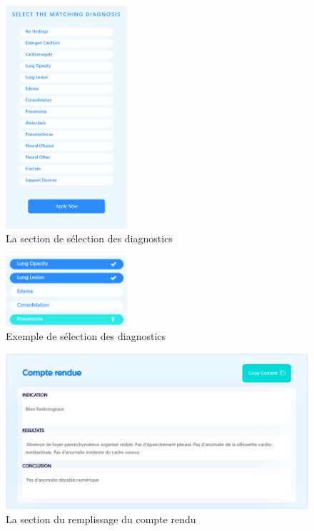 \documentclass[12pt]{report}
\begin{document}
    \begin{figure}[H]
        \centering
        \includegraphics[width=0.4\textwidth]{xpedia_select_section.png}
        \caption{La section de sélection des diagnostics}\label{fig:xpedia_select_section}
    \end{figure}
    \begin{figure}[H]
        \centering
        \includegraphics[width=0.4\textwidth]{xpedia_select_items.png}
        \caption{Exemple de sélection des diagnostics}\label{fig:xpedia_select_items}
    \end{figure}
    \begin{figure}[H]
        \centering
        \includegraphics[width=\textwidth]{xpedia_cr.png}
        \caption{La section du remplissage du compte rendu}\label{fig:xpedia_cr}
    \end{figure}
\end{document}
